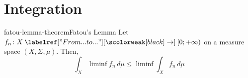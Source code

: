 \documentclass[preview]{standalone}
\begin{document}
\genpage

\section{Integration}

\begin{snippettheorem}{fatou-lemma-theorem}{Fatou's Lemma}
    Let \(f_n \colon X \fromto [0; +\infty)\) on a measure space \((X, \Sigma, \mu)\). Then,
    \[
        \int_X \liminf f_n \, d\mu \leq \liminf \int_X f_n \, d\mu
    \]
\end{snippettheorem}
\end{document}
